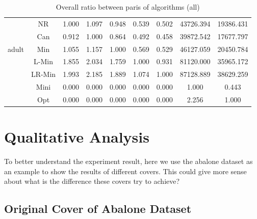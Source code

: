 \documentclass[11pt]{book}
\begin{document}
\begin{table}
\begin{tabular}{|c|c|c|c|c|c|c|c|c|}
    \hline
    \multirow{5}{*}{adult}
         & NR & 1.000 & 1.097 & 0.948 & 0.539 & 0.502 & 43726.394 & 19386.431 \\                                                                                                                                     
         & Can & 0.912 & 1.000 & 0.864 & 0.492 & 0.458 & 39872.542 & 17677.797 \\                                                                                                                                    
         & Min & 1.055 & 1.157 & 1.000 & 0.569 & 0.529 & 46127.059 & 20450.784 \\                                                                                                                                    
         & L-Min & 1.855 & 2.034 & 1.759 & 1.000 & 0.931 & 81120.000 & 35965.172 \\                                                                                                                                  
         & LR-Min & 1.993 & 2.185 & 1.889 & 1.074 & 1.000 & 87128.889 & 38629.259 \\                                                                                                                                 
         & Mini & 0.000 & 0.000 & 0.000 & 0.000 & 0.000 & 1.000 & 0.443 \\                                                                                                                                           
         & Opt & 0.000 & 0.000 & 0.000 & 0.000 & 0.000 & 2.256 & 1.000 \\
    	
    \hline

    
\end{tabular}

	\caption{Overall ratio between paris of algorithms (all)}

\end{table}

\section{Qualitative Analysis}

To better understand the experiment result, here we use the abalone dataset as an example to show the results of different covers. This could give more sense about what is the difference these covers try to achieve?

\subsection{Original Cover of Abalone Dataset}
\end{document}
